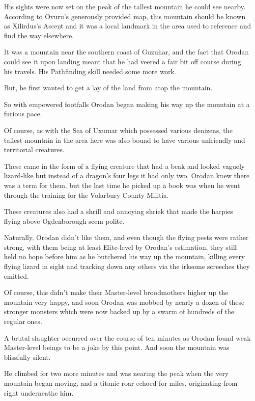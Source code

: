 \documentclass[a4paper,10pt]{book}
\begin{document}
His sights were now set on the peak of the tallest mountain he could see nearby. According to Ovuru’s generously provided map, this mountain should be known as Xilirdus’s Ascent and it was a local landmark in the area used to reference and find the way elsewhere.\par
It was a mountain near the southern coast of Guzuhar, and the fact that Orodan could see it upon landing meant that he had veered a fair bit off course during his travels. His Pathfinding skill needed some more work.\par
But, he first wanted to get a lay of the land from atop the mountain.\par
So with empowered footfalls Orodan began making his way up the mountain at a furious pace.\par
Of course, as with the Sea of Uxumar which possessed various denizens, the tallest mountain in the area here was also bound to have various unfriendly and territorial creatures.\par
These came in the form of a flying creature that had a beak and looked vaguely lizard-like but instead of a dragon’s four legs it had only two. Orodan knew there was a term for them, but the last time he picked up a book was when he went through the training for the Volarbury County Militia.\par
These creatures also had a shrill and annoying shriek that made the harpies flying above Ogdenborough seem polite.\par
Naturally, Orodan didn’t like them, and even though the flying pests were rather strong, with them being at least Elite-level by Orodan’s estimation, they still held no hope before him as he butchered his way up the mountain, killing every flying lizard in sight and tracking down any others via the irksome screeches they emitted.\par
Of course, this didn’t make their Master-level broodmothers higher up the mountain very happy, and soon Orodan was mobbed by nearly a dozen of these stronger monsters which were now backed up by a swarm of hundreds of the regular ones.\par
A brutal slaughter occurred over the course of ten minutes as Orodan found weak Master-level beings to be a joke by this point. And soon the mountain was blissfully silent.\par
He climbed for two more minutes and was nearing the peak when the very mountain began moving, and a titanic roar echoed for miles, originating from right underneathe him.\par
\end{document}
